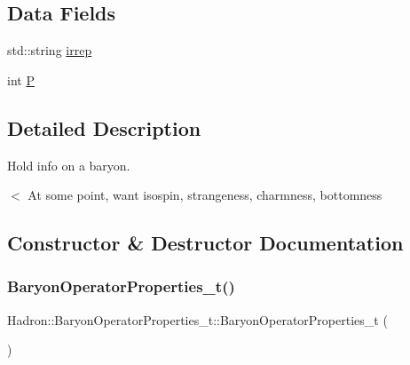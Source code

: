 \subsection*{Data Fields}
\begin{DoxyCompactItemize}
\item 
std\+::string \mbox{\hyperlink{structHadron_1_1BaryonOperatorProperties__t_a4356cd638575da7c5dd5e43fdeed7130}{irrep}}
\item 
int \mbox{\hyperlink{structHadron_1_1BaryonOperatorProperties__t_abb8040bfa73ba989712f04a7d723da10}{P}}
\end{DoxyCompactItemize}


\subsection{Detailed Description}
Hold info on a baryon. 

$<$ At some point, want isospin, strangeness, charmness, bottomness 

\subsection{Constructor \& Destructor Documentation}
\mbox{\label{structHadron_1_1BaryonOperatorProperties__t_a473494cc88a9f80c5a54b487f2d6d768}} 
\subsubsection{\texorpdfstring{BaryonOperatorProperties\_t()}{BaryonOperatorProperties\_t()}\hspace{0.1cm}{\footnotesize\ttfamily [1/4]}}
{\footnotesize\ttfamily Hadron\+::\+Baryon\+Operator\+Properties\+\_\+t\+::\+Baryon\+Operator\+Properties\+\_\+t (\begin{DoxyParamCaption}{ }\end{DoxyParamCaption})\hspace{0.3cm}{\ttfamily [inline]}}

\mbox{\label{structHadron_1_1BaryonOperatorProperties__t_abeb72a1861d69240e37cbe96b936eef5}} 
